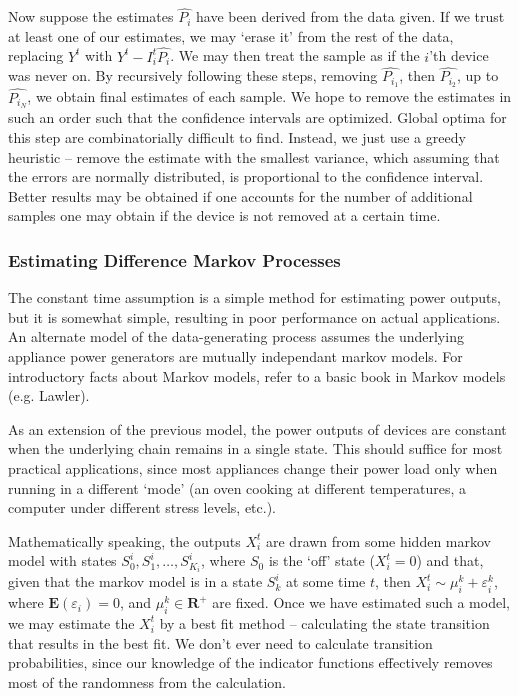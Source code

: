 \documentclass{article}
\begin{document}
Now suppose the estimates $\hat{P_i}$ have been derived from the data given. If we trust at least one of our estimates, we may `erase it' from the rest of the data, replacing $Y^t$ with $Y^t - I_i^t \hat{P_i}$. We may then treat the sample as if the $i$'th device was never on. By recursively following these steps, removing $\hat{P_{i_1}}$, then $\hat{P_{i_2}}$, up to $\hat{P_{i_N}}$, we obtain final estimates of each sample. We hope to remove the estimates in such an order such that the confidence intervals are optimized. Global optima for this step are combinatorially difficult to find. Instead, we just use a greedy heuristic -- remove the estimate with the smallest variance, which assuming that the errors are normally distributed, is proportional to the confidence interval. Better results may be obtained if one accounts for the number of additional samples one may obtain if the device is not removed at a certain time.

\subsubsection{Estimating Difference Markov Processes}

The constant time assumption is a simple method for estimating power outputs, but it is somewhat simple, resulting in poor performance on actual applications. An alternate model of the data-generating process assumes the underlying appliance power generators are mutually independant markov models. For introductory facts about Markov models, refer to a basic book in Markov models (e.g. Lawler).

As an extension of the previous model, the power outputs of devices are constant when the underlying chain remains in a single state. This should suffice for most practical applications, since most appliances change their power load only when running in a different `mode' (an oven cooking at different temperatures, a computer under different stress levels, etc.).

Mathematically speaking, the outputs $X_i^t$ are drawn from some hidden markov model with states $S^i_0, S^i_1, \dots, S^i_{K_i}$, where $S_0$ is the `off' state ($X_i^t = 0$) and that, given that the markov model is in a state $S^i_k$ at some time $t$, then $X_i^t \sim \mu_i^k + \varepsilon_i^k$, where $\mathbf{E}(\varepsilon_i) = 0$, and $\mu_i^k \in \mathbf{R}^+$ are fixed. Once we have estimated such a model, we may estimate the $X_i^t$ by a best fit method -- calculating the state transition that results in the best fit. We don't ever need to calculate transition probabilities, since our knowledge of the indicator functions effectively removes most of the randomness from the calculation.
\end{document}
